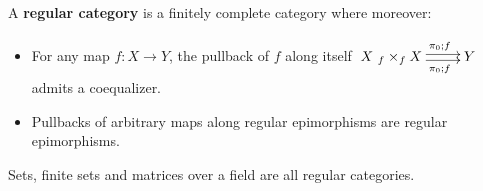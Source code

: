 \begin{definition}
A {\bf regular category} is a finitely complete category where moreover:

\begin{itemize}
\item For any map $f:X\to Y$, the pullback of $f$ along itself $\xymatrix{X\ {}_f \times_f X  \ar@<-.5ex>[r]_{\ \ \ \ \pi_0;f} \ar@<.5ex>[r]^{\ \ \ \ \pi_0;f} & Y}$ admits a coequalizer.

\item Pullbacks of arbitrary maps along regular epimorphisms are regular epimorphisms.
\end{itemize}

\end{definition}


\begin{example}
Sets, finite sets and matrices over a field are all regular categories.
\end{example}


